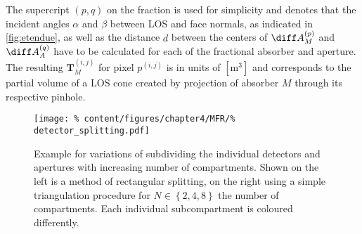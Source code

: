 %
        The supercript $\left(p,q\right)$ on the fraction is used for simplicity and denotes that the incident angles $\alpha$ and $\beta$ between LOS and face normals, as indicated in \cref{fig:etendue}, as well as the distance $d$ between the centers of $\diff A_{M}^{\left(p\right)}$ and $\diff A_{A}^{\left(q\right)}$ have to be calculated for each of the fractional absorber and aperture. The resulting  $\mathbf{T}_{M}^{\left(i,j\right)}$ for pixel $p^{\left(i,j\right)}$ is in units of $\left[\text{m}^{3}\right]$ and corresponds to the partial volume of a LOS cone created by projection of absorber $M$ through its respective pinhole.%
%
        \begin{figure}[t]%
            \centering%
            \texttt{[image: \%
                content/figures/chapter4/MFR/\%
                detector\_splitting.pdf]}%
            \caption{Example for variations of subdividing the individual detectors and apertures with increasing number of compartments. Shown on the left is a method of rectangular splitting, on the right using a simple triangulation procedure for $N\in\left\{2,4,8\right\}$ the number of compartments. Each individual subcompartment is coloured differently.}\label{fig:detector_splitting}%
        \end{figure}%
%
